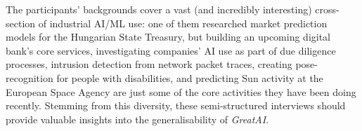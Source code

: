 The participants' backgrounds cover a vast (and incredibly interesting) cross-section of industrial AI/ML use: one of them researched market prediction models for the Hungarian State Treasury, but building an upcoming digital bank's core services, investigating companies' AI use as part of due diligence processes, intrusion detection from network packet traces, creating pose-recognition for people with disabilities, and predicting Sun activity at the European Space Agency are just some of the core activities they have been doing recently. Stemming from this diversity, these semi-structured interviews should provide valuable insights into the generalisability of \textit{GreatAI}.






